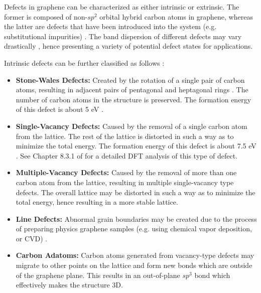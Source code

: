 \documentclass[]{article}
\begin{document}
Defects in graphene can be characterized as either intrinsic or extrinsic. The former is composed of non-$sp^2$ orbital hybrid carbon atoms in graphene, whereas the latter are defects that have been introduced into the system (e.g. substitutional impurities) \cite{a_review_on_lattice_defects_in_graphene}. The band dispersion of different defects may vary drastically \cite{band_dispersion_graphene_structural_defects}, hence presenting a variety of potential defect states for applications.
\newline

Intrinsic defects can be further classified as follows \cite{a_review_on_lattice_defects_in_graphene}:

\begin{itemize}
	\item \textbf{Stone-Wales Defects:} Created by the rotation of a single pair of carbon atoms, resulting in adjacent pairs of pentagonal and heptagonal rings \cite{a_review_on_lattice_defects_in_graphene}. The number of carbon atoms in the structure is preserved. The formation energy of this defect is about 5 eV \cite{Stone_Wales_Defect_Formation_Energy}.   
	\item \textbf{Single-Vacancy Defects:} Caused by the removal of a single carbon atom from the lattice. The rest of the lattice is distorted in such a way as to minimize the total energy. The formation energy of this defect is about 7.5 eV \cite{Single_vacancy_defect_formation_energy}. See Chapter 8.3.1 of \cite{Properties_of_graphene:_a_theoretical_perspective} for a detailed DFT analysis of this type of defect.
	
	\item \textbf{Multiple-Vacancy Defects:} Caused by the removal of more than one carbon atom from the lattice, resulting in multiple single-vacancy type defects. The overall lattice may be distorted in such a way as to minimize the total energy, hence resulting in a more stable lattice. 
	
	\item \textbf{Line Defects:} Abnormal grain boundaries may be created due to the process of preparing physics graphene samples (e.g. using chemical vapor deposition, or CVD) \cite{a_review_on_lattice_defects_in_graphene}.
	
	\item \textbf{Carbon Adatoms:} Carbon atoms generated from vacancy-type defects may migrate to other points on the lattice and form new bonds which are outside of the graphene plane. This results in an out-of-plane $sp^3$ bond which effectively makes the structure 3D.
\end{itemize}
\end{document}
